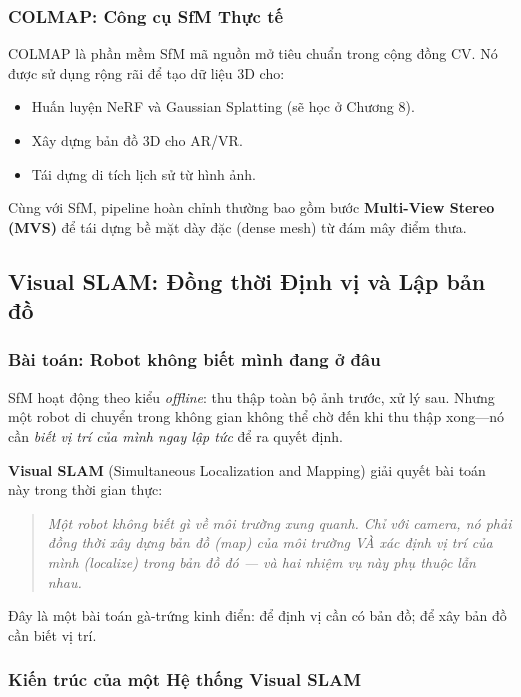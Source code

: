 \subsubsection{COLMAP: Công cụ SfM Thực tế}
\label{subsubsec:colmap}

COLMAP \cite{Schonberger2016} là phần mềm SfM mã nguồn mở tiêu chuẩn trong cộng đồng CV. Nó được sử dụng rộng rãi để tạo dữ liệu 3D cho:
\begin{itemize}
    \item Huấn luyện NeRF và Gaussian Splatting (sẽ học ở Chương 8).
    \item Xây dựng bản đồ 3D cho AR/VR.
    \item Tái dựng di tích lịch sử từ hình ảnh.
\end{itemize}

Cùng với SfM, pipeline hoàn chỉnh thường bao gồm bước \textbf{Multi-View Stereo (MVS)} để tái dựng bề mặt dày đặc (dense mesh) từ đám mây điểm thưa.

\subsection{Visual SLAM: Đồng thời Định vị và Lập bản đồ}
\label{subsec:visual_slam}

\subsubsection{Bài toán: Robot không biết mình đang ở đâu}
\label{subsubsec:slam_problem}

SfM hoạt động theo kiểu \textit{offline}: thu thập toàn bộ ảnh trước, xử lý sau. Nhưng một robot di chuyển trong không gian không thể chờ đến khi thu thập xong—nó cần \textit{biết vị trí của mình ngay lập tức} để ra quyết định.

\textbf{Visual SLAM} (Simultaneous Localization and Mapping) giải quyết bài toán này trong thời gian thực:
\begin{quote}
    \textit{Một robot không biết gì về môi trường xung quanh. Chỉ với camera, nó phải đồng thời xây dựng bản đồ (map) của môi trường VÀ xác định vị trí của mình (localize) trong bản đồ đó — và hai nhiệm vụ này phụ thuộc lẫn nhau.}
\end{quote}

Đây là một bài toán gà-trứng kinh điển: để định vị cần có bản đồ; để xây bản đồ cần biết vị trí.

\subsubsection{Kiến trúc của một Hệ thống Visual SLAM}
\label{subsubsec:slam_architecture}

